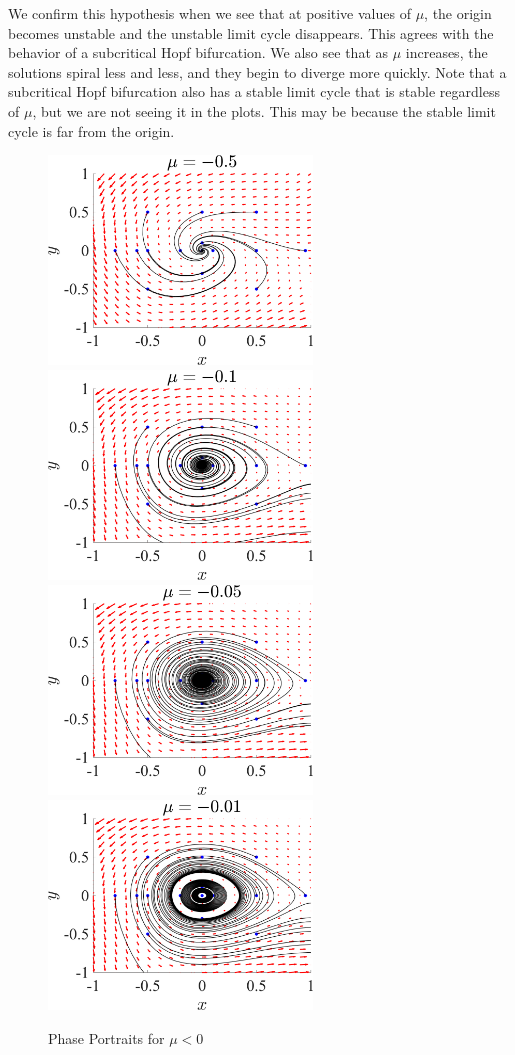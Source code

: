 \documentclass[11pt]{article}
\begin{document}
We confirm this hypothesis when we see that at positive values of $\mu$, the origin becomes unstable and the unstable limit cycle disappears. This agrees with the behavior of a subcritical Hopf bifurcation. We also see that as $\mu$ increases, the solutions spiral less and less, and they begin to diverge more quickly. Note that a subcritical Hopf bifurcation also has a stable limit cycle that is stable regardless of $\mu$, but we are not seeing it in the plots. This may be because the stable limit cycle is far from the origin.

\begin{figure}[h]
\centering
\includegraphics[width=7cm]{Hopf_823_phase_mu-0.5.png}
\includegraphics[width=7cm]{Hopf_823_phase_mu-0.1.png}
\includegraphics[width=7cm]{Hopf_823_phase_mu-0.05.png}
\includegraphics[width=7cm]{Hopf_823_phase_mu-0.01.png}
\caption{Phase Portraits for $\mu < 0$}
\end{figure}
\end{document}
